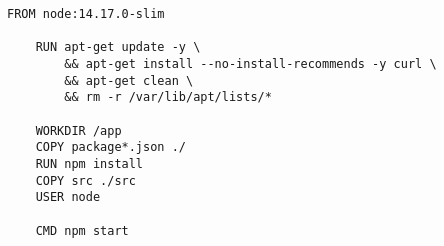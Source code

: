 \begin{lstlisting}[language=docker,caption={Express.js Dockerfile},breaklines=true,label={lst:expressDockerfile}]
    FROM node:14.17.0-slim

    RUN apt-get update -y \
        && apt-get install --no-install-recommends -y curl \
        && apt-get clean \
        && rm -r /var/lib/apt/lists/*    

    WORKDIR /app
    COPY package*.json ./
    RUN npm install
    COPY src ./src
    USER node

    CMD npm start
\end{lstlisting}
